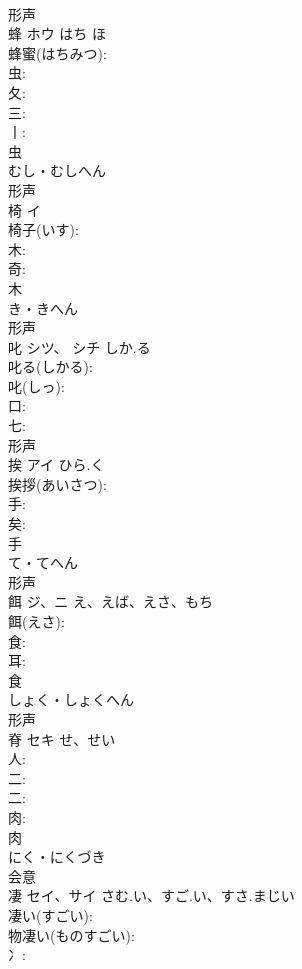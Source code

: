 \documentclass[8pt]{extreport}
\begin{document}
\begin{CJK}{UTF8}{min}
\\	形声 
\\	蜂	ホウ	はち	ほ	
\\	蜂蜜(はちみつ): 
\\	虫: 
\\	夂: 
\\	三: 
\\	丨: 
\\	虫	
\\	むし・むしへん	
\\	形声 
\\	椅	イ			
\\	椅子(いす): 
\\	木: 
\\	奇: 
\\	木	
\\	き・きへん	
\\	形声 
\\	叱	シツ、 シチ	しか.る		
\\	叱る(しかる): 
\\	叱(しっ): 
\\	口: 
\\	七: 
\\	形声 
\\	挨	アイ	ひら.く		
\\	挨拶(あいさつ): 
\\	手: 
\\	矣: 
\\	手	
\\	て・てへん	
\\	形声 
\\	餌	ジ、ニ	え、えば、えさ、もち		
\\	餌(えさ): 
\\	食: 
\\	耳: 
\\	食	
\\	しょく・しょくへん	
\\	形声 
\\	脊	セキ	せ、せい		
\\	人: 
\\	二: 
\\	二: 
\\	肉: 
\\	肉	
\\	にく・にくづき	
\\	会意 
\\	凄	セイ、サイ	さむ.い、すご.い、すさ.まじい		
\\	凄い(すごい): 
\\	物凄い(ものすごい): 
\\	冫: 

\end{CJK}
\end{document}
